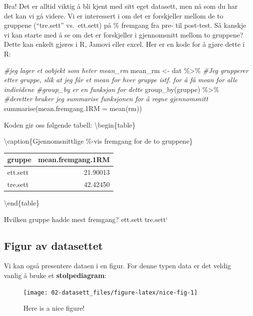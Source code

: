\documentclass[
]{book}
\newenvironment{Shaded}{\begin{snugshade}}{\end{snugshade}}
\newcommand{\AttributeTok}[1]{\textcolor[rgb]{0.77,0.63,0.00}{#1}}
\newcommand{\CommentTok}[1]{\textcolor[rgb]{0.56,0.35,0.01}{\textit{#1}}}
\newcommand{\FunctionTok}[1]{\textcolor[rgb]{0.00,0.00,0.00}{#1}}
\newcommand{\NormalTok}[1]{#1}
\newcommand{\OtherTok}[1]{\textcolor[rgb]{0.56,0.35,0.01}{#1}}
\newcommand{\SpecialCharTok}[1]{\textcolor[rgb]{0.00,0.00,0.00}{#1}}
\begin{document}
Bra! Det er alltid viktig å bli kjent med sitt eget datasett, men nå som du har det kan vi gå videre. Vi er interessert i om det er forskjeller mellom de to gruppene (``tre.sett'' vs.~ett.sett) på \% fremgang fra pre- til post-test. Så kanskje vi kan starte med å se om det er forskjeller i gjennomsnitt mellom to gruppene? Dette kan enkelt gjøres i R, Jamovi eller excel. Her er en kode for å gjøre dette i R:

\begin{Shaded}
\begin{Highlighting}[]
\CommentTok{\#jeg lager et oobjekt som heter mean\_rm }
\NormalTok{mean\_rm }\OtherTok{\textless{}{-}}\NormalTok{ dat }\SpecialCharTok{\%\textgreater{}\%}
  \CommentTok{\#Jeg grupperer etter gruppe, slik at jeg får et mean for hver gruppe istf. for å få mean for alle individene}
  \CommentTok{\#group\_by er en funksjon for dette}
  \FunctionTok{group\_by}\NormalTok{(gruppe) }\SpecialCharTok{\%\textgreater{}\%}
  \CommentTok{\#deretter bruker jeg summarise funksjonen for å regne gjennomsnitt}
  \FunctionTok{summarise}\NormalTok{(}\AttributeTok{mean.fremgang.1RM =} \FunctionTok{mean}\NormalTok{(rm))}
\end{Highlighting}
\end{Shaded}

Koden gir oss følgende tabell:
\textbackslash begin\{table\}

\textbackslash caption\{\label{tab:unnamed-chunk-6}Gjennomsnittlige \%-vis fremgang for de to gruppene\}
\centering

\begin{tabular}[t]{lr}
\toprule
gruppe & mean.fremgang.1RM\\
\midrule
ett.sett & 21.90013\\
tre.sett & 42.42450\\
\bottomrule
\end{tabular}

\textbackslash end\{table\}

Hvilken gruppe hadde mest fremgang?
ett.sett tre.sett`

\hypertarget{figur-av-datasettet}{%
\subsection{Figur av datasettet}\label{figur-av-datasettet}}

Vi kan også presentere dataen i en figur. For denne typen data er det veldig vanlig å bruke et \textbf{stolpediagram}:

\begin{figure}

{\centering \texttt{[image: 02-datasett\_files/figure-latex/nice-fig-1]} 

}

\caption{Here is a nice figure!}\label{fig:nice-fig}
\end{figure}
\end{document}
